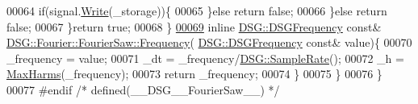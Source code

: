 \begin{DoxyCode}
00064                     \textcolor{keywordflow}{if}(signal.\hyperlink{class_d_s_g_1_1_ring_buffer_aa5dd2caa0a270173251faee40a43d692}{Write}(\_storage))\{
00065                     \}\textcolor{keywordflow}{else} \textcolor{keywordflow}{return} \textcolor{keyword}{false};
00066                 \}\textcolor{keywordflow}{else} \textcolor{keywordflow}{return} \textcolor{keyword}{false};
00067             \}\textcolor{keywordflow}{return} \textcolor{keyword}{true};
00068         \}
\hypertarget{_fourier_saw_8h_source_l00069}{}\hyperlink{class_d_s_g_1_1_fourier_1_1_fourier_saw_afa3d86f404be3665f10c74fe9286ef10}{00069}         \textcolor{keyword}{inline} \hyperlink{namespace_d_s_g_a4315a061386fa1014fda09b15d3a6973}{DSG::DSGFrequency} \textcolor{keyword}{const}& 
      \hyperlink{class_d_s_g_1_1_signal_generator_a4e6b3c43e76e53f8cd337ad699c464cb}{DSG::Fourier::FourierSaw::Frequency}(
      \hyperlink{namespace_d_s_g_a4315a061386fa1014fda09b15d3a6973}{DSG::DSGFrequency} \textcolor{keyword}{const}& value)\{
00070             \_frequency = value;
00071             \_dt = \_frequency/\hyperlink{namespace_d_s_g_a72df05177db0412c3590070923f62819}{DSG::SampleRate}();
00072             \_h = \hyperlink{namespace_d_s_g_ab5c4eea42ea10b69cfc32afb83ff1d0d}{MaxHarms}(\_frequency);
00073             \textcolor{keywordflow}{return} \_frequency;
00074         \}
00075     \}
00076 \}
00077 \textcolor{preprocessor}{#endif }\textcolor{comment}{/* defined(\_\_DSG\_\_FourierSaw\_\_) */}\textcolor{preprocessor}{}
\end{DoxyCode}
